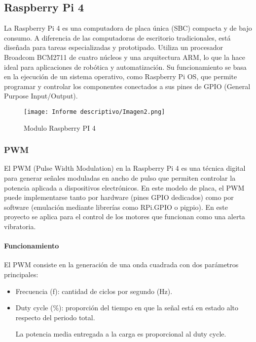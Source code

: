 \documentclass[12pt,a4paper]{article}
\begin{document}
\subsection{Raspberry Pi 4}
La Raspberry Pi 4 es una computadora de placa única (SBC) compacta y de bajo consumo. A diferencia de las computadoras de escritorio tradicionales, está diseñada para tareas especializadas y prototipado. Utiliza un procesador Broadcom BCM2711 de cuatro núcleos y una arquitectura ARM, lo que la hace ideal para aplicaciones de robótica y automatización. Su funcionamiento se basa en la ejecución de un sistema operativo, como Raspberry Pi OS, que permite programar y controlar los componentes conectados a sus pines de GPIO (General Purpose Input/Output).
\begin{figure}[H]
\centering
\texttt{[image: Informe descriptivo/Imagen2.png]}
\caption{Modulo Raspberry PI 4}
\end{figure}

\subsubsection{PWM}

El PWM (Pulse Width Modulation) en la Raspberry Pi 4 es una técnica digital para generar señales moduladas en ancho de pulso que permiten controlar la potencia aplicada a dispositivos electrónicos.
En este modelo de placa, el PWM puede implementarse tanto por hardware (pines GPIO dedicados) como por software (emulación mediante librerías como RPi.GPIO o pigpio). En este proyecto se aplica para el control de los motores que funcionan como una alerta vibratoria.

\paragraph{Funcionamiento}
El PWM consiste en la generación de una onda cuadrada con dos parámetros principales:

\begin{itemize}
\item Frecuencia (f): cantidad de ciclos por segundo (Hz).

\item Duty cycle (\%): proporción del tiempo en que la señal está en estado alto respecto del periodo total.

La potencia media entregada a la carga es proporcional al duty cycle.
\end{itemize}
\end{document}
